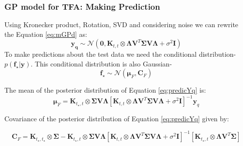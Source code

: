 \documentclass{beamer}
\begin{document}
\begin{frame}
\frametitle{GP model for TFA: Making Prediction}

Using Kronecker product, Rotation, SVD and considering noise we can rewrite the Equation \ref{eq:mGPd} as:
\begin{equation} \label{eq:predicYq}
  \mathbf{y_q}  \sim \mathcal{N} \left( \mathbf{0}, 
    \mathbf{K}_{t,t} \otimes \boldsymbol{\Lambda} \mathbf{V}^T\boldsymbol{\Sigma} \mathbf{V} \boldsymbol{\Lambda} +
    \sigma^2\mathbf{I}\right)
\end{equation}
To make predictions about the test data we need the conditional distribution- $p(\textbf{f}_\star|\textbf{y})$. This conditional distribution is also Gaussian-
\begin{equation} \label{eq:predicYq}
  \mathbf{f}_\star  \sim \mathcal{N} \left( \boldsymbol{\mu}_F, \boldsymbol{C}_F \right)
\end{equation}

The mean of the posterior distribution of Equation \ref{eq:predicYq} is:
\begin{equation} \label{eq:prediction_MuF}
  \boldsymbol{\mu}_F = 
    \mathbf{K}_{t_\star,t} \otimes \boldsymbol{\Sigma} \mathbf{V} \boldsymbol{\Lambda}
    \left[ \mathbf{K}_{t,t} \otimes \boldsymbol{\Lambda} \mathbf{V}^T\boldsymbol{\Sigma} \mathbf{V} \boldsymbol{\Lambda} + \sigma^2 \mathbf{I} \right]^{-1}\mathbf{y}_q
\end{equation}

Covariance of the posterior distribution of Equation \ref{eq:predicYq} %
given by:

\begin{dmath}
  \boldsymbol{C}_F = 
    \mathbf{K}_{t_\star,t_\star} \otimes \boldsymbol{\Sigma} -
    \mathbf{K}_{t_\star,t} \otimes \boldsymbol{\Sigma}\mathbf{V} \boldsymbol{\Lambda}
    \left[ \mathbf{K}_{t,t} \otimes \boldsymbol{\Lambda} \mathbf{V}^T\boldsymbol{\Sigma} \mathbf{V} \boldsymbol{\Lambda} + \sigma^2 \mathbf{I} \right]^{-1} 
    \left[ \mathbf{K}_{t_\star,t} \otimes \boldsymbol{\Lambda} \mathbf{V}^T\boldsymbol{\Sigma}\right]
\end{dmath}


\end{frame}
\end{document}
